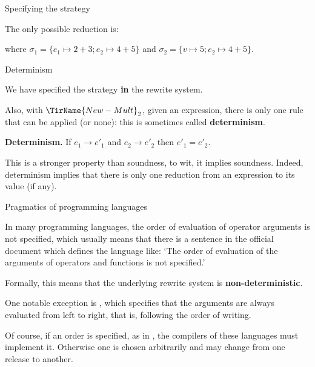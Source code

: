 %
\begin{frame}{Specifying the strategy}

  The only possible reduction is:
  where \(\sigma_1=\{e_1 \mapsto 2+3; e_2 \mapsto 4+5\}\) and
  \(\sigma_2=\{v \mapsto 5; e_2 \mapsto 4+5\}\).

\end{frame}

%
\begin{frame}{Determinism}

  We have specified the strategy \textbf{in} the rewrite system.

  \bigskip

  Also, with \(\TirName{New-Mult}_2\), given an expression, there is
  only one rule that can be applied (or none): this is sometimes
  called \textbf{determinism}.

  \bigskip

  \textbf{Determinism.} If \(e_1 \rightarrow e'_1\) and \(e_2
  \rightarrow e'_2\) then \(e'_1 = e'_2\).

  \bigskip

  This is a stronger property than soundness, to wit, it implies
  soundness. Indeed, determinism implies that there is only one
  reduction from an expression to its value (if any).

\end{frame}

%
\begin{frame}{Pragmatics of programming languages}

  In many programming languages, the order of evaluation of operator
  arguments is not specified, which usually means that there is a
  sentence in the official document which defines the language like:
  `The order of evaluation of the arguments of operators and functions
  is not specified.'

  \bigskip

  Formally, this means that the underlying rewrite system is
  \textbf{non\hyp{}deterministic}.

  \bigskip

  One notable exception is \Java, which specifies that the arguments
  are always evaluated from left to right, that is, following the
  order of writing.

  \bigskip

  Of course, if an order is specified, as in \Java, the compilers of
  these languages must implement it. Otherwise one is chosen
  arbitrarily and may change from one release to another.

\end{frame}

